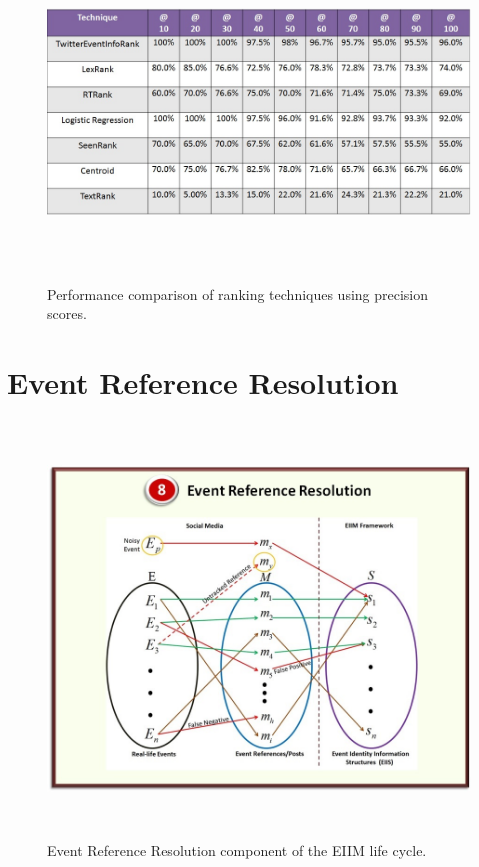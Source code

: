 \begin{figure}[htbp]
\centering
\includegraphics[height=3.5in,width=5.5in]{Figures/sydneysiegeprecision.jpg}
\caption{\small Performance comparison of ranking techniques using precision scores.}
\label{sydneysiegeprecision}
\end{figure}


\section{Event Reference Resolution}

\begin{figure}[htbp]
  \caption{Event Reference Resolution component of the EIIM life cycle.}
  \centering
    \includegraphics[width=14cm,height=11cm]{Figures/EIIMComponents/EventReferenceResolution.jpg}
\end{figure}

